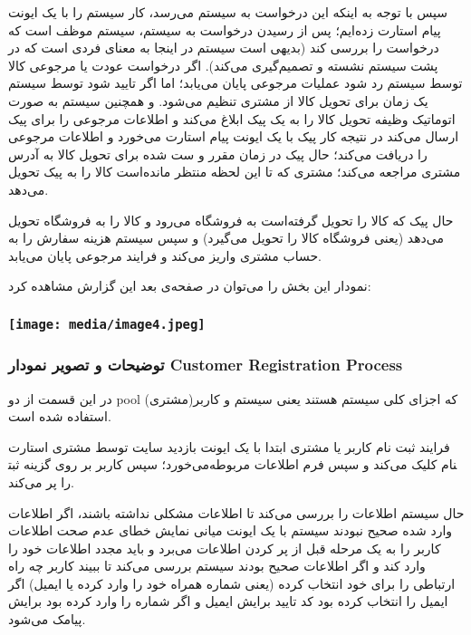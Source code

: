\documentclass[]{article}
\begin{document}
سپس با توجه به اینکه این درخواست به سیستم می‌رسد، کار سیستم را با یک
ایونت پیام استارت زده‌ایم؛ پس از رسیدن درخواست به سیستم، سیستم موظف است
که درخواست را بررسی کند (بدیهی است سیستم در اینجا به معنای فردی است که
در پشت سیستم نشسته و تصمیم‌گیری می‌کند). اگر درخواست عودت یا مرجوعی کالا
توسط سیستم رد شود عملیات مرجوعی پایان می‌یابد؛ اما اگر تایید شود توسط
سیستم یک زمان برای تحویل کالا از مشتری تنظیم می‌شود. و همچنین سیستم به
صورت اتوماتیک وظیفه تحویل کالا را به یک پیک ابلاغ می‌کند و اطلاعات
مرجوعی را برای پیک ارسال می‌کند در نتیجه کار پیک با یک ایونت پیام استارت
می‌خورد و اطلاعات مرجوعی را دریافت می‌کند؛ حال پیک در زمان مقرر و ست شده
برای تحویل کالا به آدرس مشتری مراجعه می‌کند؛ مشتری که تا این لحظه منتظر
مانده‌است کالا را به پیک تحویل می‌دهد.

حال پیک که کالا را تحویل گرفته‌است به فروشگاه می‌رود و کالا را به
فروشگاه تحویل می‌دهد (یعنی فروشگاه کالا را تحویل می‌گیرد) و سپس سیستم
هزینه سفارش را به حساب مشتری واریز می‌کند و فرایند مرجوعی پایان می‌یابد.

نمودار این بخش را می‌توان در صفحه‌ی بعد این گزارش مشاهده کرد:

\subsubsection{}\label{section}

\subsubsection{\texorpdfstring{\protect\hypertarget{_Toc62248360}{}{\protect\hypertarget{_Toc62248870}{}{}}\protect\texttt{[image: media/image4.jpeg]}}{}}\label{section-1}

\subsubsection{توضیحات و تصویر نمودار Customer Registration
Process}\label{ux62aux648ux636ux6ccux62dux627ux62a-ux648-ux62aux635ux648ux6ccux631-ux646ux645ux648ux62fux627ux631-customer-registration-process}

در این قسمت از دو pool که اجزای کلی سیستم هستند یعنی سیستم و
کاربر(مشتری) استفاده شده است.

فرایند ثبت نام کاربر یا مشتری ابتدا با یک ایونت بازدید سایت توسط مشتری
استارت می‌خورد؛ سپس کاربر بر روی گزینه ثبت‎نام کلیک می‌کند و سپس فرم
اطلاعات مربوطه را پر می‌کند.

حال سیستم اطلاعات را بررسی می‌کند تا اطلاعات مشکلی نداشته باشند، اگر
اطلاعات وارد شده صحیح نبودند سیستم با یک ایونت میانی نمایش خطای عدم صحت
اطلاعات کاربر را به یک مرحله قبل از پر کردن اطلاعات می‌برد و باید مجدد
اطلاعات خود را وارد کند و اگر اطلاعات صحیح بودند سیستم بررسی می‌کند تا
ببیند کاربر چه راه ارتباطی را برای خود انتخاب کرده (یعنی شماره همراه خود
را وارد کرده یا ایمیل) اگر ایمیل را انتخاب کرده بود کد تایید برایش ایمیل
و اگر شماره را وارد کرده بود برایش پیامک می‌شود.
\end{document}
